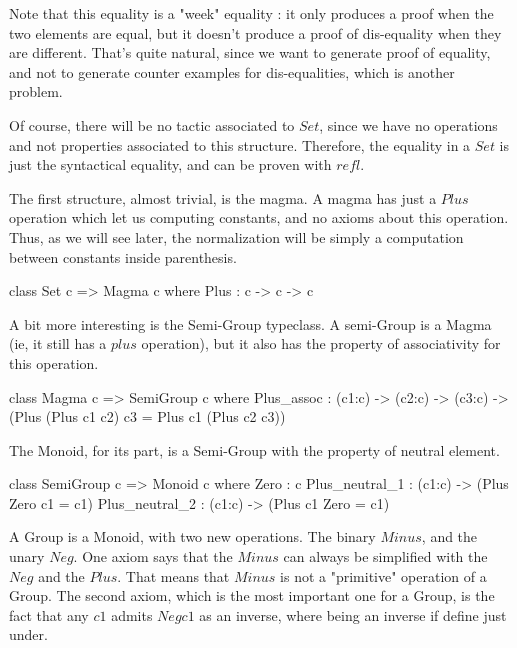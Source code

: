 \documentclass{sigplanconf}
\begin{document}
Note that this equality is a "week" equality : it only produces a proof when the two elements are equal, but it doesn't produce a proof of dis-equality when they are different. That's quite natural, since we want to generate proof of equality, and not to generate counter examples for dis-equalities, which is another problem.

Of course, there will be no tactic associated to $Set$, since we have no operations and not properties associated to this structure. Therefore, the equality in a $Set$ is just the syntactical equality, and can be proven with $refl$.

The first structure, almost trivial, is the magma. A magma has just a $Plus$ operation which let us computing constants, and no axioms about this operation. Thus, as we will see later, the normalization will be simply a computation between constants inside parenthesis.

\begin{code}[caption=Magma, captionpos=b, label=lst1:haskell2]   
class Set c => Magma c where
    Plus : c -> c -> c
\end{code}

A bit more interesting is the Semi-Group typeclass. A semi-Group is a Magma (ie, it still has a $plus$ operation), but it also has the property of associativity for this operation.

\begin{code}[caption=Semi-Group, captionpos=b, label=lst1:haskell2]   
class Magma c => SemiGroup c where
    Plus_assoc : (c1:c) -> (c2:c) -> (c3:c) -> (Plus (Plus c1 c2) c3 = Plus c1 (Plus c2 c3))
\end{code}

The Monoid, for its part, is a Semi-Group with the property of neutral element.

\begin{code}[caption=Monoid, captionpos=b, label=lst1:haskell2]   
class SemiGroup c => Monoid c where
	Zero : c    
    Plus_neutral_1 : (c1:c) -> (Plus Zero c1 = c1)    
    Plus_neutral_2 : (c1:c) -> (Plus c1 Zero = c1)
\end{code}	

A Group is a Monoid, with two new operations. The binary $Minus$, and the unary $Neg$. One axiom says that the $Minus$ can always be simplified with the $Neg$ and the $Plus$. That means that $Minus$ is not a "primitive" operation of a Group.
The second axiom, which is the most important one for a Group, is the fact that any $c1$ admits $Neg c1$ as an inverse, where being an inverse if define just under.
\end{document}
